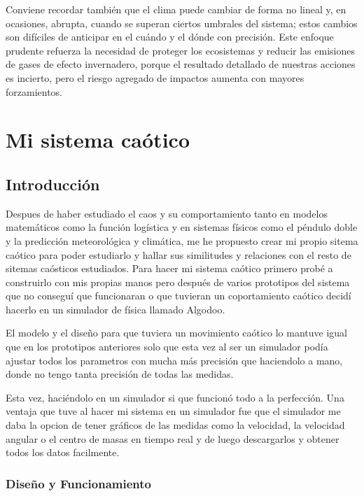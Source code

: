\documentclass[
  11pt,
  a4paper,
  DIV=11,
  numbers=noendperiod]{scrreprt}
\begin{document}
Conviene recordar también que el clima puede cambiar de forma no lineal
y, en ocasiones, abrupta, cuando se superan ciertos umbrales del
sistema; estos cambios son difíciles de anticipar en el cuándo y el
dónde con precisión. Este enfoque prudente refuerza la necesidad de
proteger los ecosistemas y reducir las emisiones de gases de efecto
invernadero, porque el resultado detallado de nuestras acciones es
incierto, pero el riesgo agregado de impactos aumenta con mayores
forzamientos.

\part{Mi sistema caótico}

\chapter{Introducción}\label{introducciuxf3n-6}

Despues de haber estudiado el caos y su comportamiento tanto en modelos
matemáticos como la función logística y en sistemas físicos como el
péndulo doble y la predicción meteorológica y climática, me he propuesto
crear mi propio sitema caótico para poder estudiarlo y hallar sus
similitudes y relaciones con el resto de sitemas caósticos estudiados.
Para hacer mi sistema caótico primero probé a construirlo con mis
propias manos pero después de varios prototipos del sistema que no
conseguí que funcionaran o que tuvieran un coportamiento caótico decidí
hacerlo en un simulador de física llamado Algodoo.

El modelo y el diseño para que tuviera un movimiento caótico lo mantuve
igual que en los prototipos anteriores solo que esta vez al ser un
simulador podía ajustar todos los parametros con mucha más precisión que
haciendolo a mano, donde no tengo tanta precisión de todas las medidas.

Esta vez, haciéndolo en un simulador si que funcionó todo a la
perfección. Una ventaja que tuve al hacer mi sistema en un simulador fue
que el simulador me daba la opcion de tener gráficos de las medidas como
la velocidad, la velocidad angular o el centro de masas en tiempo real y
de luego descargarlos y obtener todos los datos facilmente.

\section{Diseño y Funcionamiento}\label{diseuxf1o-y-funcionamiento}
\end{document}
